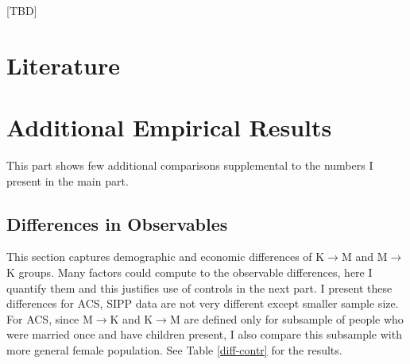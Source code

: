 \documentclass[12pt,letter]{article}
\begin{document}
[TBD]

\clearpage

\section*{Literature}



\newpage
\appendix
\section{Additional Empirical Results\label{extra-comparisons}}
This part shows few additional comparisons supplemental to the numbers I present in the main part.

\subsection{Differences in Observables\label{comp-diff-appendix}}
This section captures demographic and economic differences of K$\to$M and M$\to$K groups. Many factors could compute to the observable differences, here I quantify them and this justifies use of controls in the next part. I present these differences for ACS, SIPP data are not very different except smaller sample size. For ACS, since M$\to$K and K$\to$M are defined only for subsample of people who were married once and have children present, I also compare this subsample with more general female population. See Table \ref{diff-contr} for the results.
\end{document}
